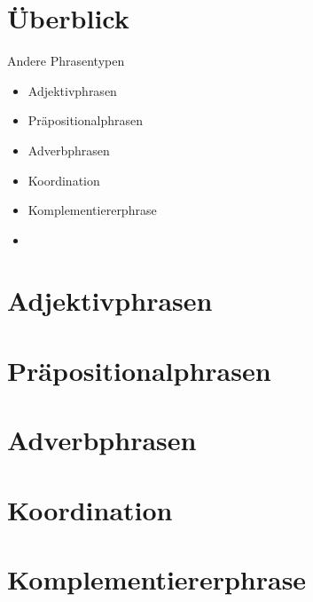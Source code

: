 
\section{Überblick}

\begin{frame}
  {Andere Phrasentypen}
  \onslide<+->
  \begin{itemize}[<+->]
    \item Adjektivphrasen
    \item Präpositionalphrasen
    \item Adverbphrasen
    \item Koordination
    \item Komplementiererphrase
      \Zeile
    \item \citet[12.2,12.4--12.7]{Schaefer2018b}
  \end{itemize}
\end{frame}

\section{Adjektivphrasen}

\section{Präpositionalphrasen}

\section{Adverbphrasen}

\section{Koordination}

\section{Komplementiererphrase}

